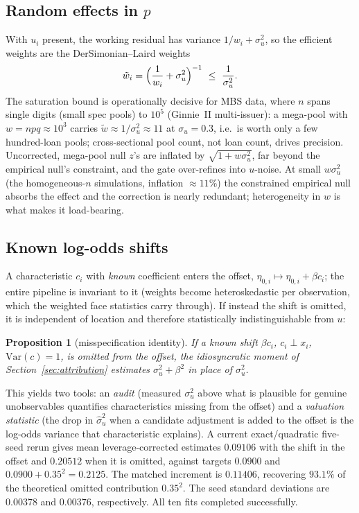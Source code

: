 \documentclass[11pt]{article}
\newtheorem{proposition}{Proposition}[section]
\newcommand{\Var}{\mathrm{Var}}
\begin{document}
\subsection{Random effects in $p$}
With $u_i$ present, the working residual has variance $1/w_i+\sigma_u^2$, so the
efficient weights are the DerSimonian--Laird weights
\begin{equation}\label{eq:dlw}
\tilde w_i=\Bigl(\frac{1}{w_i}+\sigma_u^2\Bigr)^{-1}\ \le\ \frac{1}{\sigma_u^2}.
\end{equation}
The saturation bound is operationally decisive for MBS data, where $n$ spans single
digits (small spec pools) to $10^5$ (Ginnie~II multi-issuer): a mega-pool with
$w=npq\approx 10^3$ carries $\tilde w\approx 1/\sigma_u^2\approx 11$ at
$\sigma_u=0.3$, i.e.\ is worth only a few hundred-loan pools; cross-sectional pool
count, not loan count, drives precision. Uncorrected, mega-pool null $z$'s are inflated
by $\sqrt{1+w\sigma_u^2}$, far beyond the empirical null's constraint, and the gate
over-refines into $u$-noise. At small $w\sigma_u^2$ (the homogeneous-$n$ simulations,
inflation $\approx 11\%$) the constrained empirical null absorbs the effect and the
correction is nearly redundant; heterogeneity in $w$ is what makes it load-bearing.

\subsection{Known log-odds shifts}
A characteristic $c_i$ with \emph{known} coefficient enters the offset,
$\eta_{0,i}\mapsto\eta_{0,i}+\beta c_i$; the entire pipeline is invariant to it (weights
become heteroskedastic per observation, which the weighted face statistics carry
through). If instead the shift is omitted, it is independent of location and therefore
statistically indistinguishable from $u$:

\begin{proposition}[misspecification identity]\label{prop:audit}
If a known shift $\beta c_i$, $c_i\perp x_i$, $\Var(c)=1$, is omitted from the offset,
the idiosyncratic moment of Section~\ref{sec:attribution} estimates
$\sigma_u^2+\beta^2$ in place of $\sigma_u^2$.
\end{proposition}

\noindent This yields two tools: an \emph{audit} (measured $\sigma_u^2$ above what is
plausible for genuine unobservables quantifies characteristics missing from the
offset) and a \emph{valuation statistic} (the drop in $\hat\sigma_u^2$ when a candidate
adjustment is added to the offset is the log-odds variance that characteristic
explains). A current exact/quadratic five-seed rerun gives mean leverage-corrected estimates
$0.09106$ with the shift in the offset and $0.20512$ when it is omitted, against targets
$0.0900$ and $0.0900+0.35^2=0.2125$. The matched increment is $0.11406$, recovering
$93.1\%$ of the theoretical omitted contribution $0.35^2$. The seed standard deviations are
$0.00378$ and $0.00376$, respectively. All ten fits completed successfully.
\end{document}
